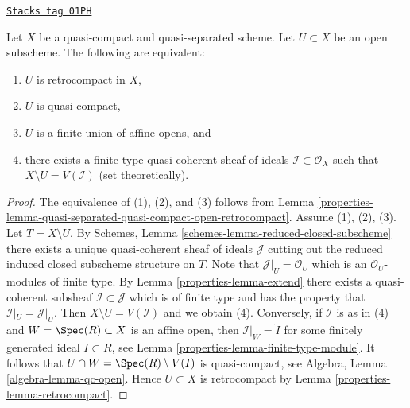 \begin{lemma}
\label{properties-lemma-quasi-coherent-finite-type-ideals}
\href{https://stacks.math.columbia.edu/tag/01PH}{\texttt{Stacks tag 01PH}}

Let $X$ be a quasi-compact and quasi-separated scheme.
Let $U \subset X$ be an open subscheme. The following are equivalent:
\begin{enumerate}
\item $U$ is retrocompact in $X$,
\item $U$ is quasi-compact,
\item $U$ is a finite union of affine opens, and
\item there exists a finite type quasi-coherent sheaf of ideals
$\mathcal{I} \subset \mathcal{O}_X$ such that $X \setminus U = V(\mathcal{I})$
(set theoretically).
\end{enumerate}
\end{lemma}

\begin{proof}

The equivalence of (1), (2), and (3) follows from
Lemma \ref{properties-lemma-quasi-separated-quasi-compact-open-retrocompact}.
Assume (1), (2), (3). Let $T = X \setminus U$. By
Schemes, Lemma \ref{schemes-lemma-reduced-closed-subscheme} there exists
a unique quasi-coherent sheaf of ideals $\mathcal{J}$ cutting
out the reduced induced closed subscheme structure on $T$.
Note that $\mathcal{J}|_U = \mathcal{O}_U$ which is an
$\mathcal{O}_U$-modules of finite type.
By Lemma \ref{properties-lemma-extend} there exists a quasi-coherent subsheaf
$\mathcal{I} \subset \mathcal{J}$ which is of finite type
and has the property that $\mathcal{I}|_U = \mathcal{J}|_U$.
Then $X \setminus U = V(\mathcal{I})$ and we obtain (4). Conversely,
if $\mathcal{I}$ is as in (4) and $W = \Spec(R) \subset X$ is an affine
open, then $\mathcal{I}|_W = \widetilde{I}$ for some finitely generated
ideal $I \subset R$, see Lemma \ref{properties-lemma-finite-type-module}.
It follows that $U \cap W = \Spec(R) \setminus V(I)$ is quasi-compact,
see Algebra, Lemma \ref{algebra-lemma-qc-open}. Hence $U \subset X$
is retrocompact by Lemma \ref{properties-lemma-retrocompact}.
\end{proof}

